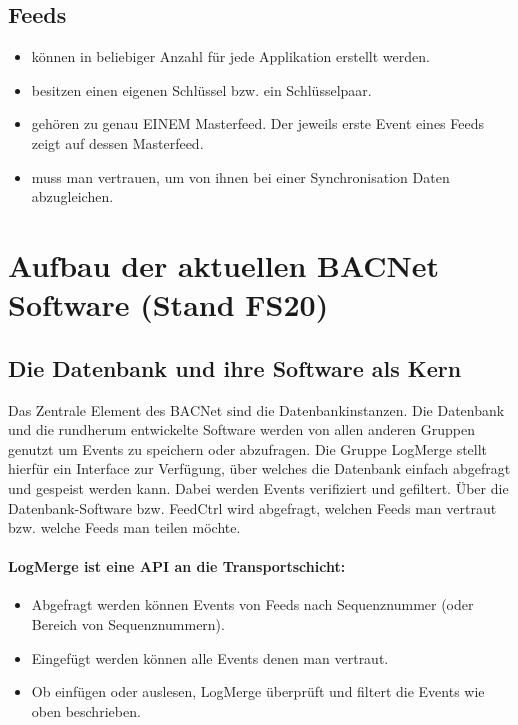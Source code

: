 \documentclass[a4paper, fontsize=9pt, oneside, headsepline=.5pt,footsepline=.5pt]{scrartcl}
\begin{document}
\subsection{Feeds}
\begin{itemize}
    \item können in beliebiger Anzahl für jede Applikation erstellt werden.
    \item besitzen einen eigenen Schlüssel bzw. ein Schlüsselpaar.
    \item gehören zu genau EINEM Masterfeed. Der jeweils erste Event eines Feeds zeigt auf dessen Masterfeed.
    \item muss man vertrauen, um von ihnen bei einer Synchronisation Daten abzugleichen.
\end{itemize}

\section{Aufbau der aktuellen BACNet Software (Stand FS20)}

\subsection{Die Datenbank und ihre Software als Kern}
Das Zentrale Element des BACNet sind die Datenbankinstanzen. Die Datenbank und die rundherum entwickelte Software werden von allen anderen Gruppen genutzt um Events zu speichern oder abzufragen. Die Gruppe LogMerge stellt hierfür ein Interface zur Verfügung, über welches die Datenbank einfach abgefragt und gespeist werden kann. Dabei werden Events verifiziert und gefiltert. Über die Datenbank-Software bzw. FeedCtrl wird abgefragt, welchen Feeds man vertraut bzw. welche Feeds man teilen möchte.

\paragraph{LogMerge ist eine API an die Transportschicht:}
\begin{itemize}
    \item Abgefragt werden können Events von Feeds nach Sequenznummer (oder Bereich von Sequenznummern).
    \item Eingefügt werden können alle Events denen man vertraut.
    \item Ob einfügen oder auslesen, LogMerge überprüft und filtert die Events wie oben beschrieben.
\end{itemize}
\end{document}
